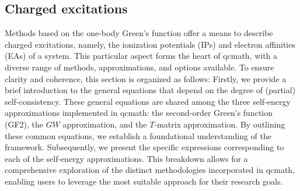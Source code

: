 \documentclass[aip,jcp,reprint,noshowkeys,superscriptaddress]{revtex4-1}
\begin{document}
\subsection{Charged excitations}
\label{sec:charged_excitations}
Methods based on the one-body Green's function offer a means to describe charged excitations, namely, the ionization potentials (IPs) and electron affinities (EAs) of a system. This particular aspect forms the heart of qcmath, with a diverse range of methods, approximations, and options available. To ensure clarity and coherence, this section is organized as follows:
Firstly, we provide a brief introduction to the general equations that depend on the degree of (partial) self-consistency. These general equations are shared among the three self-energy approximations implemented in qcmath: the second-order Green's function (GF2), the $GW$ approximation, and the $T$-matrix approximation. By outlining these common equations, we establish a foundational understanding of the framework.
Subsequently, we present the specific expressions corresponding to each of the self-energy approximations. This breakdown allows for a comprehensive exploration of the distinct methodologies incorporated in qcmath, enabling users to leverage the most suitable approach for their research goals.
\end{document}
